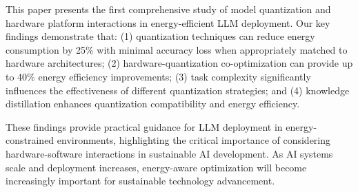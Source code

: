 \documentclass[sigconf,review]{acmart}
\begin{document}
This paper presents the first comprehensive study of model quantization and hardware platform interactions in energy-efficient LLM deployment. Our key findings demonstrate that: (1) quantization techniques can reduce energy consumption by 25\% with minimal accuracy loss when appropriately matched to hardware architectures; (2) hardware-quantization co-optimization can provide up to 40\% energy efficiency improvements; (3) task complexity significantly influences the effectiveness of different quantization strategies; and (4) knowledge distillation enhances quantization compatibility and energy efficiency.

These findings provide practical guidance for LLM deployment in energy-constrained environments, highlighting the critical importance of considering hardware-software interactions in sustainable AI development. As AI systems scale and deployment increases, energy-aware optimization will become increasingly important for sustainable technology advancement.
\end{document}
